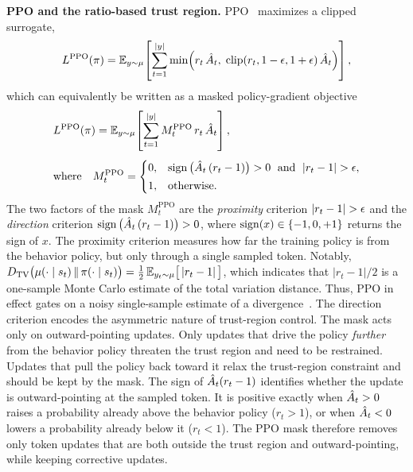 \noindent\textbf{PPO and the ratio-based trust region.}
PPO~\citep{ppo} maximizes a clipped surrogate,
\begin{equation}
\label{eq:ppo}
L^{\mathrm{PPO}}(\pi)=\mathbb{E}_{y\sim\mu}\!\left[\sum_{t=1}^{|y|}
\min\!\Big(r_t\,\hat{A}_t,\;\operatorname{clip}(r_t,1-{\epsilon},1+{\epsilon})\,\hat{A}_t\Big)\right],
\end{equation}
which can equivalently be written as a masked policy-gradient objective
\begin{equation}
\label{eq:ppo-mask}
\begin{aligned}
&L^{\mathrm{PPO}}(\tpi)=\E_{y\sim\bmu}\!\left[\sum_{t=1}^{|y|} M_t^{\mathrm{PPO}}\,r_t\,\Adv_t\right],
\\[4pt]
&\text{where}\quad M_t^{\mathrm{PPO}}=
\begin{cases}
0, & \sign\big(\Adv_t\,(r_t-1)\big)>0 \;\text{ and }\; |r_t-1|>\eps,\\[2pt]
1, & \text{otherwise.}
\end{cases}
\end{aligned}
\end{equation}
The two factors of the mask $M_t^{\mathrm{PPO}}$ are the
\emph{proximity} criterion $|r_t-1|>\eps$ and the \emph{direction} criterion
$\operatorname{sign}\big(\hat{A}_t\,(r_t-1)\big)>0$, where $\operatorname{sign}(x)\in\{-1,0,+1\}$ returns the sign of $x$.
The proximity criterion measures how far the
training policy is from the behavior policy, but only through a single sampled token. Notably,
$D_{\mathrm{TV}}\big(\mu(\cdot\mid s_t)\,\|\,\pi(\cdot\mid s_t)\big)=
\tfrac12\,\mathbb{E}_{y_t\sim\mu}\big[\,|r_t-1|\,\big]$,
which indicates that $|r_t-1|/2$ is a one-sample Monte Carlo estimate of the total variation distance.
Thus, PPO in effect gates on a noisy single-sample estimate of a
divergence~\citep{dppo}. 
The direction criterion encodes the asymmetric nature of trust-region control.
The mask acts only on outward-pointing updates.
Only updates that drive the policy \emph{further} from the behavior policy
threaten the trust region and need to be restrained.
Updates that pull the policy back toward it relax the trust-region constraint
and should be kept by the mask.
The sign of $\hat{A}_t(r_t-1)$ identifies whether the update is outward-pointing at
the sampled token.
It is positive exactly when $\hat{A}_t>0$ raises a probability already above the
behavior policy ($r_t>1$), or when $\hat{A}_t<0$ lowers a probability already below
it ($r_t<1$).
The PPO mask therefore removes only token updates that are both outside the trust
region and outward-pointing, while keeping corrective updates.

